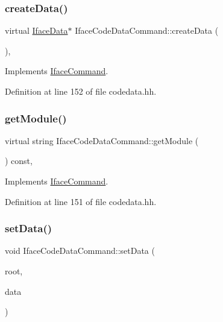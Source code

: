 \subsubsection{\texorpdfstring{createData()}{createData()}}
{\footnotesize\ttfamily virtual \mbox{\hyperlink{class_iface_data}{Iface\+Data}}$\ast$ Iface\+Code\+Data\+Command\+::create\+Data (\begin{DoxyParamCaption}\item[{void}]{ }\end{DoxyParamCaption})\hspace{0.3cm}{\ttfamily [inline]}, {\ttfamily [virtual]}}



Implements \mbox{\hyperlink{class_iface_command_a908e484baf6e090b46ceb2ccaea8139d}{Iface\+Command}}.



Definition at line 152 of file codedata.\+hh.

\mbox{\label{class_iface_code_data_command_abfa633dd19e5672b125425a9541c94d3}} 
\subsubsection{\texorpdfstring{getModule()}{getModule()}}
{\footnotesize\ttfamily virtual string Iface\+Code\+Data\+Command\+::get\+Module (\begin{DoxyParamCaption}\item[{void}]{ }\end{DoxyParamCaption}) const\hspace{0.3cm}{\ttfamily [inline]}, {\ttfamily [virtual]}}



Implements \mbox{\hyperlink{class_iface_command_a06f9500f4b0a0e3cf14010cf133502d5}{Iface\+Command}}.



Definition at line 151 of file codedata.\+hh.

\mbox{\label{class_iface_code_data_command_a778193a98c1a977a3635e63eb15a26d0}} 
\subsubsection{\texorpdfstring{setData()}{setData()}}
{\footnotesize\ttfamily void Iface\+Code\+Data\+Command\+::set\+Data (\begin{DoxyParamCaption}\item[{\mbox{\hyperlink{class_iface_status}{Iface\+Status}} $\ast$}]{root,  }\item[{\mbox{\hyperlink{class_iface_data}{Iface\+Data}} $\ast$}]{data }\end{DoxyParamCaption})\hspace{0.3cm}{\ttfamily [virtual]}}



